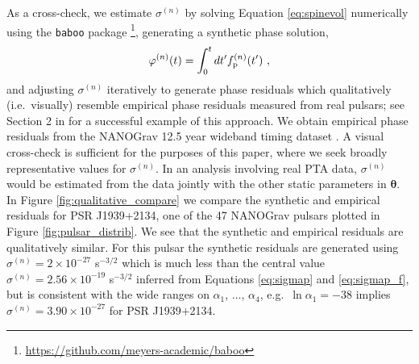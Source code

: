 \documentclass[fleqn,usenatbib,useAMS]{mnras}
\begin{document}
As a cross-check, we estimate $\sigma^{(n)}$ by solving Equation \eqref{eq:spinevol} numerically using the \texttt{baboo} package \footnote{\url{https://github.com/meyers-academic/baboo}}, generating a synthetic phase solution,
\begin{eqnarray}
	\varphi^{(n)}(t) = \int_0^t dt' f^{(n)}_{\rm p}(t') \ ,
\end{eqnarray}
and adjusting $\sigma^{(n)}$ iteratively to generate phase residuals which qualitatively (i.e.\ visually) resemble empirical phase residuals measured from real pulsars; see Section 2 in \cite{Vargas} for a successful example of this approach. We obtain empirical phase residuals from the NANOGrav 12.5 year wideband timing dataset \citep{pennucci_timothy_t_2020_4312887,nanogravwideband}. A visual cross-check is sufficient for the purposes of this paper, where we seek broadly representative values for $\sigma^{(n)}$. In an analysis involving real PTA data, $\sigma^{(n)}$ would be estimated from the data jointly with the other static parameters in ${\boldsymbol{\theta}}$. In Figure \ref{fig:qualitative_compare} we compare the synthetic and empirical residuals for PSR J1939+2134, one of the 47 NANOGrav pulsars plotted in Figure \ref{fig:pulsar_distrib}. We see that the synthetic and empirical residuals are qualitatively similar. For this pulsar the synthetic residuals are generated using $\sigma^{(n)} = 2 \times 10^{-27}$ s$^{-3/2}$ which is much less than the central value $\sigma^{(n)} = 2.56 \times 10^{-19}$ s$^{-3/2}$ inferred from Equations \eqref{eq:sigmap} and \eqref{eq:sigmap_f}, but is consistent with the wide ranges on $\alpha_1$, $\dots$, $\alpha_4$, e.g.\ $\ln \alpha_1 = -38$ implies $\sigma^{(n)}= 3.90 \times 10^{-27}$ for PSR J1939$+$2134.

\end{document}
